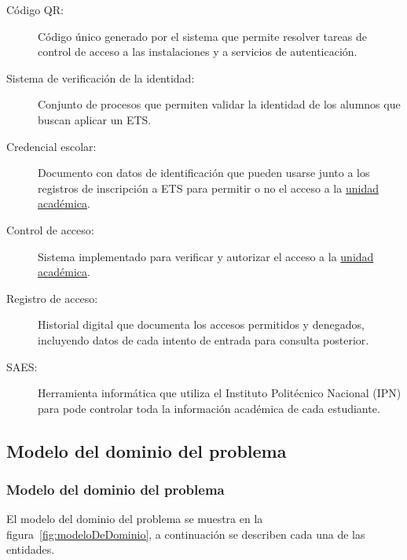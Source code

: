 \begin{description}
	\item[\hypertarget{tCodigoQR}{Código QR:}] Código único generado por el sistema que permite resolver tareas de control de acceso a las instalaciones y a servicios de autenticación.
	
	\item[\hypertarget{tSistemaVerificacion}{Sistema de verificación de la identidad:}] Conjunto de procesos que permiten validar la identidad de los alumnos que buscan aplicar un ETS.
	
	\item[\hypertarget{tCredencialEscolar}{Credencial escolar:}] Documento con datos de identificación que pueden usarse junto a los registros de inscripción a ETS para permitir o no el acceso a la \hyperlink{tUnidadAcademica}{unidad académica}.
	
	\item[\hypertarget{tControlAcceso}{Control de acceso:}] Sistema implementado para verificar y autorizar el acceso a la \hyperlink{tUnidadAcademica}{unidad académica}.
	
	\item[\hypertarget{tRegistroAcceso}{Registro de acceso:}] Historial digital que documenta los accesos permitidos y denegados, incluyendo datos de cada intento de entrada para consulta posterior.
	
	\item[\hypertarget{tSAES}{SAES:}] Herramienta informática que utiliza el Instituto Politécnico Nacional (IPN) para pode controlar toda la información académica de cada estudiante.
	
\end{description}


\subsection{Modelo del dominio del problema}
\label{sec:modeloDeDominioP}


\subsubsection{Modelo del dominio del problema}

El modelo del dominio del problema se muestra en la figura~\ref{fig:modeloDeDominio}, a continuación se describen cada una de las entidades.

